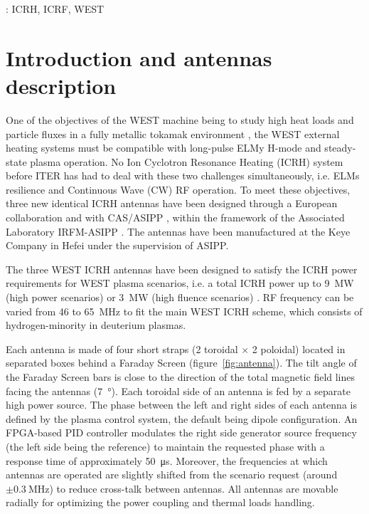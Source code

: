 \documentclass[12p]{iopart}
\begin{document}
%
\vspace{2pc}
: ICRH, ICRF, WEST

\submitto{\NF}
 



\section{Introduction and antennas description}
One of the objectives of the WEST machine being to study high heat loads and particle fluxes in a fully metallic tokamak environment \cite{bucalossi2021, bourdelle2015}, the WEST external heating systems must be compatible with long-pulse ELMy H-mode and steady-state plasma operation. No Ion Cyclotron Resonance Heating (ICRH) system before ITER has had to deal with these two challenges simultaneously, i.e. ELMs resilience and Continuous Wave (CW) RF operation. To meet these objectives, three new identical ICRH antennas have been designed through a European collaboration and with CAS/ASIPP \cite{helou2015-1, hillairet2015-2, chen2015, vulliez2015}, within the framework of the Associated Laboratory IRFM-ASIPP \cite{yang2015}. The antennas have been manufactured at the Keye Company in Hefei under the supervision of ASIPP.

The three WEST ICRH antennas have been designed to satisfy the ICRH power requirements for WEST plasma scenarios, i.e. a total ICRH power up to \SI{9}{\mega\watt} (high power scenarios) or \SI{3}{\mega\watt} (high fluence scenarios) \cite{bourdelle2015}. RF frequency can be varied from 46 to \SI{65}{\mega\hertz} to fit the main WEST ICRH scheme, which consists of hydrogen-minority in deuterium plasmas. 

Each antenna is made of four short straps (2 toroidal $\times$ 2 poloidal) located in separated boxes behind a Faraday Screen (figure~\ref{fig:antenna}). The tilt angle of the Faraday Screen bars is close to the direction of the total magnetic field lines facing the antennas (\SI{7}{\degree}). Each toroidal side of an antenna is fed by a separate high power source. The phase between the left and right sides of each antenna is defined by the plasma control system, the default being dipole configuration. An FPGA-based PID controller modulates the right side generator source frequency (the left side being the reference) to maintain the requested phase with a response time of approximately \SI{50}{\micro\second}. Moreover, the frequencies at which antennas are operated are slightly shifted from the scenario request (around $\pm \SI{0.3}{\mega\hertz}$) to reduce cross-talk between antennas. All antennas are movable radially for optimizing the power coupling and thermal loads handling.
\end{document}

